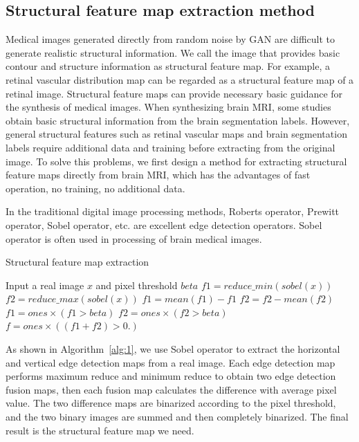 \documentclass{ecai}
\begin{document}
\subsection{Structural feature map extraction method}
Medical images generated directly from random noise by GAN are difficult to generate realistic structural information. We call the image that provides basic contour and structure information as structural feature map. For example, a retinal vascular distribution map can be regarded as a structural feature map of a retinal image\cite{41costa2017towards}. Structural feature maps can provide necessary basic guidance for the synthesis of medical images. When synthesizing brain MRI, some studies obtain basic structural information from the brain segmentation labels\cite{4shin2018medical}. However, general structural features such as retinal vascular maps and brain segmentation labels require additional data and training before extracting from the original image. 
To solve this problems, we first design a method for extracting structural feature maps directly from brain MRI, which has the advantages of fast operation, no training, no additional data.

In the traditional digital image processing methods, Roberts operator, Prewitt operator, Sobel operator, etc. are excellent edge detection operators. Sobel operator is often used in processing of brain medical images.
\begin{algorithm}
	\caption{Structural feature map extraction}
	\label{alg:1}
	\begin{algorithmic}[1]
		\State Input a real image $x$ and pixel threshold $beta$
		\State $f1 = reduce\_min(sobel(x))$
		\State $f2 = reduce\_max(sobel(x))$
		\State $f1 = mean(f1) - f1$
		\State $f2 = f2 - mean(f2)$
		\State $f1 = ones \times (f1 > beta)$
		\State $f2 = ones \times (f2 > beta)$
		\State $f = ones \times ((f1 + f2)> 0.)$
	\end{algorithmic}  
\end{algorithm}
As shown in Algorithm~\ref{alg:1}, we use Sobel operator to extract the horizontal and vertical edge detection maps from a real image. Each edge detection map performs maximum reduce and minimum reduce to obtain two edge detection fusion maps, then each fusion map calculates the difference with average pixel value. The two difference maps are binarized according to the pixel threshold, and the two binary images are summed and then completely binarized. The final result is the structural feature map we need.
\end{document}
